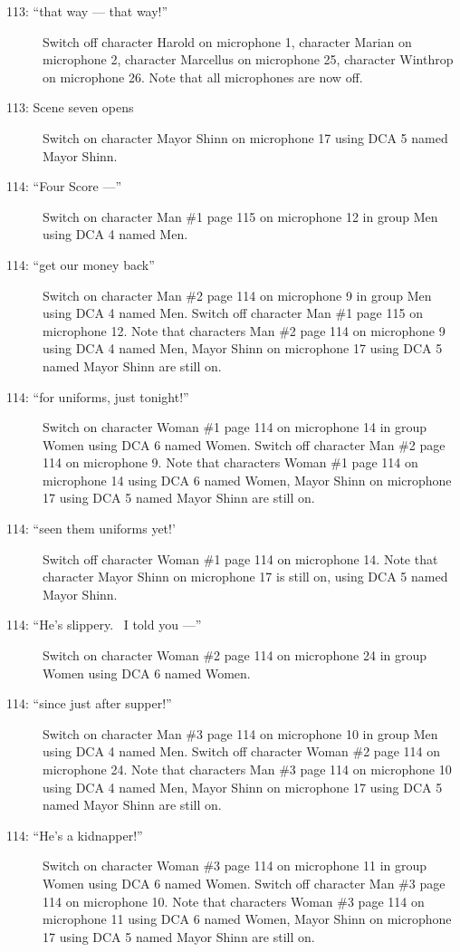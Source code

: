 \begin{description}
\item[113: ``that way --- that way!'']
Switch off character Harold on microphone 1, character Marian on microphone 2, character Marcellus on microphone 25, character Winthrop on microphone 26. Note that all microphones are now off.

\item[113: Scene seven opens]
Switch on character Mayor Shinn on microphone 17 using DCA 5 named Mayor Shinn. 

\item[114: ``Four Score ---'']
Switch on character Man \#1 page 115 on microphone 12 in group Men using DCA 4 named Men. 

\item[114: ``get our money back'']
Switch on character Man \#2 page 114 on microphone 9 in group Men using DCA 4 named Men. Switch off character Man \#1 page 115 on microphone 12. Note that characters Man \#2 page 114 on microphone 9 using DCA 4 named Men, Mayor Shinn on microphone 17 using DCA 5 named Mayor Shinn are still on.  

\item[114: ``for uniforms, just tonight!'']
Switch on character Woman \#1 page 114 on microphone 14 in group Women using DCA 6 named Women. Switch off character Man \#2 page 114 on microphone 9. Note that characters Woman \#1 page 114 on microphone 14 using DCA 6 named Women, Mayor Shinn on microphone 17 using DCA 5 named Mayor Shinn are still on.  

\item[114: ``seen them uniforms yet!']
Switch off character Woman \#1 page 114 on microphone 14. Note that character Mayor Shinn on microphone 17 is still on, using DCA 5 named Mayor Shinn.

\item[114: ``He's slippery.~ I told you ---'']
Switch on character Woman \#2 page 114 on microphone 24 in group Women using DCA 6 named Women. 

\item[114: ``since just after supper!'']
Switch on character Man \#3 page 114 on microphone 10 in group Men using DCA 4 named Men. Switch off character Woman \#2 page 114 on microphone 24. Note that characters Man \#3 page 114 on microphone 10 using DCA 4 named Men, Mayor Shinn on microphone 17 using DCA 5 named Mayor Shinn are still on.  

\item[114: ``He's a kidnapper!'']
Switch on character Woman \#3 page 114 on microphone 11 in group Women using DCA 6 named Women. Switch off character Man \#3 page 114 on microphone 10. Note that characters Woman \#3 page 114 on microphone 11 using DCA 6 named Women, Mayor Shinn on microphone 17 using DCA 5 named Mayor Shinn are still on.  


\end{description}
